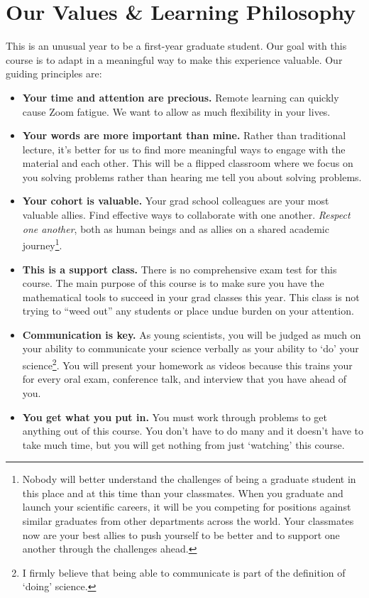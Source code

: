 \documentclass[12pt]{article}
\numberwithin{equation}{section}    %
\begin{document}
\section*{Our Values \& Learning Philosophy}

This is an unusual year to be a first-year graduate student. Our goal with this course is to adapt in a meaningful way to make this experience valuable. Our guiding principles are:

\begin{itemize}
	\item \textbf{Your time and attention are precious.} Remote learning can quickly cause Zoom fatigue. We want to allow as much flexibility in your lives.

	\item \textbf{Your words are more important than mine.} Rather than traditional lecture, it's better for us to find more meaningful ways to engage with the material and each other. This will be a flipped classroom where we focus on you solving problems rather than hearing me tell you about solving problems.

	\item \textbf{Your cohort is valuable.} Your grad school colleagues are your most valuable allies. Find effective ways to collaborate with one another. \emph{Respect one another}, both as human beings and as allies on a shared academic journey\footnote{Nobody will better understand the challenges of being a graduate student in this place and at this time than your classmates. When you graduate and launch your scientific careers, it will be you competing for positions against similar graduates from other departments across the world. Your classmates now are your best allies to push yourself to be better and to support one another through the challenges ahead.}.

	\item \textbf{This is a support class.} There is no comprehensive exam test for this course. The main purpose of this course is to make sure you have the mathematical tools to succeed in your grad classes this year. This class is not trying to ``weed out'' any students or place undue burden on your attention. 

	\item \textbf{Communication is key.} As young scientists, you will be judged as much on your ability to communicate your science verbally as your ability to `do' your science\footnote{I firmly believe that being able to communicate is part of the definition of `doing' science.}. You will present your homework as videos because this trains your for every oral exam, conference talk, and interview that you have ahead of you.
	
	\item \textbf{You get what you put in.} You must work through problems to get anything out of this course. You don't have to do many and it doesn't have to take much time, but you will get nothing from just `watching' this course.
\end{itemize}
\end{document}
